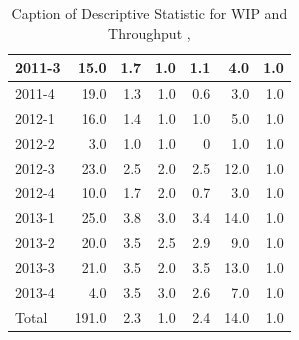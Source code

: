 \documentclass[UKenglish]{ifimaster}  %
\begin{document}
\begin{table}[!htbp]
\begin{adjustwidth}{-2.5cm}{}
{{\begin{tabular}{ | l | r | r | r | r | r | r | }
2011-3 & 15.0 & 1.7 & 1.0 & 1.1 & 4.0 & 1.0\\ \hline
2011-4 & 19.0 & 1.3 & 1.0 & 0.6 & 3.0 & 1.0\\ \hline
2012-1 & 16.0 & 1.4 & 1.0 & 1.0 & 5.0 & 1.0\\ \hline
2012-2 & 3.0 & 1.0 & 1.0 & 0 & 1.0 & 1.0\\ \hline
2012-3 & 23.0 & 2.5 & 2.0 & 2.5 & 12.0 & 1.0\\ \hline
2012-4 & 10.0 & 1.7 & 2.0 & 0.7 & 3.0 & 1.0\\ \hline
2013-1 & 25.0 & 3.8 & 3.0 & 3.4 & 14.0 & 1.0\\ \hline
2013-2 & 20.0 & 3.5 & 2.5 & 2.9 & 9.0 & 1.0\\ \hline
2013-3 & 21.0 & 3.5 & 2.0 & 3.5 & 13.0 & 1.0\\ \hline
2013-4 & 4.0 & 3.5 & 3.0 & 2.6 & 7.0 & 1.0\\ \hline
Total & 191.0 & 2.3 & 1.0 & 2.4 & 14.0 & 1.0\\ \hline
\end{tabular}
}
}
\end{adjustwidth}
\caption[Optional caption for list of figures]{Caption of Descriptive Statistic for WIP and Throughput  , }
\label{DS:8:1}
\end{table}
\end{document}
